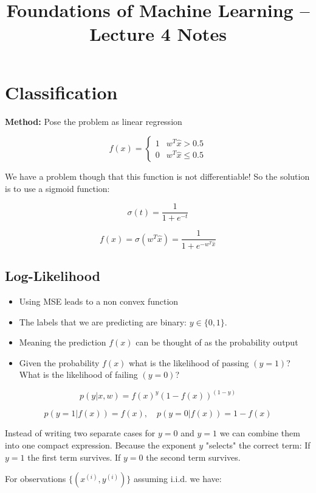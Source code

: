 \documentclass[11pt]{article}
\title{Foundations of Machine Learning -- Lecture 4 Notes}
\author{}
\date{}
\begin{document}
\maketitle

\section*{Classification}
\textbf{Method:} Pose the problem as linear regression

\[
	f(x) =
	\begin{cases}
		1 & w^T \hat{x} > 0.5    \\
		0 & w^T \hat{x} \leq 0.5
	\end{cases}
\]

We have a problem though that this function is not differentiable!
So the solution is to use a sigmoid function:

\[
	\sigma(t) = \frac{1}{1 + e^{-t}}
\]

\[
	f(x) = \sigma(w^T \hat{x}) = \frac{1}{1 + e^{-w^T \hat{x}}}
\]


\subsection*{Log-Likelihood}

\begin{itemize}


	\item Using MSE leads to a non convex function
	\item The labels that we are predicting are binary: $y \in \{0,1\}$.
	\item Meaning the prediction $f(x)$ can be thought of as the probability output
	\item Given the probability $f(x)$ what is the likelihood of passing $(y=1)$? What is the likelihood of failing $(y=0)$?
\end{itemize}

\[
	p(y|x,w) = f(x)^y (1 - f(x))^{(1-y)}
\]


\[
	p(y=1|f(x)) = f(x), \quad p(y=0|f(x)) = 1 - f(x)
\]


Instead of writing two separate cases for $y=0$ and $y=1$ we can combine them into one compact expression. Because the exponent $y$ "selects" the correct term:
If $y=1$ the first term survives.
If $y=0$ the second term survives.

\pagebreak

For observations $\{(x^{(i)}, y^{(i)})\}$ assuming i.i.d. we have:
\end{document}
